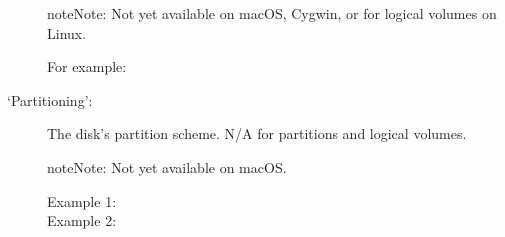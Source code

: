 \documentclass[letterpaper,10pt,english]{sphinxmanual}
\begin{document}
\begin{description}
\begin{sphinxadmonition}{note}{Note:}
Not yet available on macOS, Cygwin, or for logical volumes on Linux.
\end{sphinxadmonition}
\begin{description}
\item[{For example:}] \leavevmode
\begin{sphinxVerbatim}[commandchars=\\\{\}]
\PYG{p}{[}\PYG{p}{]}\PYG{p}{[}\PYG{p}{]}
\PYG{p}{[}      \PYG{p}{]}
\end{sphinxVerbatim}

\end{description}

\item[{‘Partitioning’:}] \leavevmode
The disk’s partition scheme. N/A for partitions and logical volumes.

\begin{sphinxadmonition}{note}{Note:}
Not yet available on macOS.
\end{sphinxadmonition}
\begin{description}
\item[{Example 1:}] \leavevmode
\begin{sphinxVerbatim}[commandchars=\\\{\}]
\PYG{p}{[}\PYG{p}{]}\PYG{p}{[}\PYG{p}{]}
\end{sphinxVerbatim}

\item[{Example 2:}] \leavevmode
\begin{sphinxVerbatim}[commandchars=\\\{\}]
\PYG{p}{[}\PYG{p}{]}\PYG{p}{[}\PYG{p}{]}
\end{sphinxVerbatim}


\end{description}
\end{description}
\end{document}
